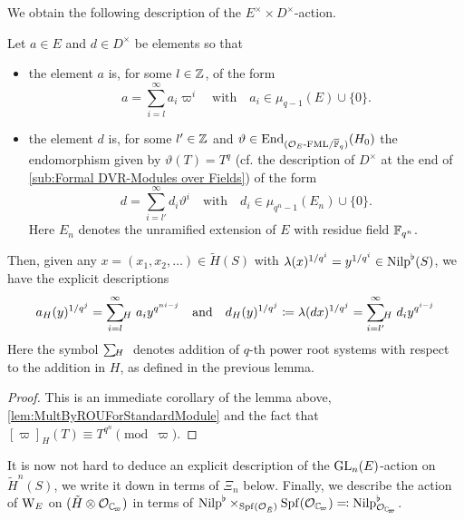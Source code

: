 \documentclass[../main.tex]{subfiles}
\begin{document}
We obtain the following description of the $E^\times \times D^\times$-action.

\begin{cor}\label{cor:ExplicitDescriptionOfActionOnUnivCov}
  Let $a \in E$ and $d \in D^\times$ be elements so that
  \begin{itemize}
    \item the element $a$ is, for some $l \in \mathbb{Z}$, of the form
      \begin{equation*}
        a = \sum_{i = l}^\infty a_i \varpi^i \quad \text{with} \quad
        a_i \in \mu_{q-1}(E) \cup \{0\}.
      \end{equation*}
    \item the element $d$ is, for some $l' \in \mathbb{Z}$ and 
      $\vartheta \in \operatorname{End}_{{({\mathcal{O}_E}\textnormal-\allowbreak\mathrm{FML}/{{\overline {\mathbb{F}}_q}})}} (H_0)$ the endomorphism given
      by $\vartheta(T) = T^q$ (cf. the description of $D^\times$ at the 
      end of \cref{sub:Formal DVR-Modules over Fields}) of the form
      \begin{equation*}
        d = \sum_{i = l'}^\infty d_i \vartheta^i \quad \text{with} \quad
        d_i \in \mu_{q^n-1}(E_n) \cup \{0\}.
      \end{equation*}
      Here $E_n$ denotes the unramified extension of $E$ with residue field 
      $\mathbb{F}_{q^n}$. 
  \end{itemize}
  Then, given any $x = (x_1, x_2, \dots)
  \in \tilde H(S)$ with $\lambda(x)^{1/q^i} = y^{1/q^i} \in {\mathrm{Nilp}}^\flat(S)$, we
  have the explicit descriptions
  \begin{equation*}
    a_H(y)^{1/q^j}  = \sum_{i=l}^\infty{\hspace{-3pt}}_H\hspace{3pt} a_i y^{q^{ni-j}}
  \quad \text{and} \quad
  d_H(y)^{1/q^j} \coloneqq \lambda(dx)^{1/q^j} = \sum_{i=l'}^\infty {\hspace{-3pt}}_H\hspace{3pt} d_i y^{q^{i-j}}
  \end{equation*}
  Here the symbol $\sum {\hspace{-3pt}}_H\hspace{3pt}$ \hspace{-10pt} denotes addition of $q$-th power
  root systems with
  respect to the addition in $H$, as defined in the previous lemma.
  \begin{proof}
    This is an immediate corollary of the lemma above, 
    \cref{lem:MultByROUForStandardModule} and the fact that 
    $[\varpi]_H(T) \equiv T^{q^n} \pmod \varpi$. 
  \end{proof}
\end{cor}

It is now not hard to deduce an explicit description of the $\operatorname{GL}_n(E)$-action
on $\tilde H^n(S)$, we write it down in terms of $\Xi_n$ below. Finally, we
describe the action of $\mathrm W_E$ on $(\tilde H \otimes \cO_\Cp)$ in terms
of $\Nilp^\flat \times_{\spf(\cO_\br E)} \Spf(\cO_\Cp) \eqcolon \Nilp^\flat_{\cO_\Cp}$.
\end{document}

